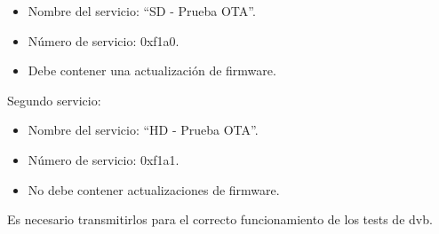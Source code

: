 \documentclass{article}
\begin{document}
\begin{itemize}
\setlength{\itemindent}{.20in}
	\item Nombre del servicio: ``SD - Prueba OTA''.
	\item Número de servicio: 0xf1a0.
	\item Debe contener una actualización de firmware.
\end{itemize}

Segundo servicio:

\begin{itemize}
\setlength{\itemindent}{.20in}
	\item Nombre del servicio: ``HD - Prueba OTA''.
	\item Número de servicio: 0xf1a1.
	\item No debe contener actualizaciones de firmware.
\end{itemize}

Es necesario transmitirlos para el correcto funcionamiento de los tests de dvb.

\FloatBarrier
\end{document}
